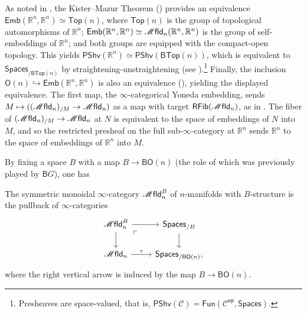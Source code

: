 \documentclass[../text]{subfiles}
\begin{document}
\begin{remark}\label{9EFM44H}
    As noted in \cite{af_fhtop}, the Kister--Mazur Theorem (\cite{kister1964microbundles}) provides an equivalence $\mathsf{Emb}(\mathbb{R}^n,\mathbb{R}^n)\simeq \mathsf{Top}(n)$, where $\mathsf{Top}(n)$ is the group of topological automorphisms of $\mathbb{R}^n$; $\mathsf{Emb}(\mathbb{R}^n,\mathbb{R}^n)\simeq\mfld_n(\mathbb{R}^n,\mathbb{R}^n)$ is the group of self-embeddings of $\mathbb{R}^n$; and both groups are equipped with the compact-open topology. This yields $\mathsf{PShv}(\mathbb{R}^n)\simeq\mathsf{PShv}(\mathsf{BTop}(n))$, which is equivalent to $\mathsf{Spaces}_{/\mathsf{BTop}(n)}$ by straightening-unstraightening (see ).\footnote{Presheaves are space-valued, that is, $\mathsf{PShv}(\mathscr{C})=\mathsf{Fun}(\mathscr{C}^{\mathsf{op}},\mathsf{Spaces})$.} Finally, the inclusion $\mathsf{O}(n)\hookrightarrow\mathsf{Emb}(\mathbb{R}^n,\mathbb{R}^n)$ is also an equivalence (\cite[Proposition 2.2.6]{af_primer}), yielding the displayed equivalence. The first map, the $\infty$-categorical Yoneda embedding, sends $M\mapsto((\mfld_{n})_{/M}\to\mfld_n)$ as a map with target $\mathsf{RFib}(\mfld_n)$, as in \cite{lurie_htt}. The fiber of $(\mfld_{n})_{/M}\to\mfld_n$ at $N$ is equivalent to the space of embeddings of $N$ into $M$, and so the restricted presheaf on the full sub-$\infty$-category at $\mathbb{R}^n$ sends $\mathbb{R}^n$ to the space of embeddings of $\mathbb{R}^n$ into $M$. 
\end{remark}

By fixing a space $B$ with a map $B \rightarrow \mathsf{BO}(n)$ (the role of which was previously played by $\mathsf{B}G$), one has
%
\begin{definition}
    The symmetric monoidal $\infty$-category $\mfld_n^B$ of $n$-manifolds with $B$-structure is the pullback of $\infty$-categories
    \begin{equation}
        \begin{tikzcd}
            \mfld_n^B \arrow[dr, phantom, "\ulcorner", very near start] \arrow[r] \arrow[d] & \mathsf{Spaces}_{/B} \arrow[d] \\
            \mfld_n \arrow[r, "\tau"] & \mathsf{Spaces}_{/\mathsf{BO}(n)},
        \end{tikzcd}
    \end{equation}
    where the right vertical arrow is induced by the map $B \rightarrow \mathsf{BO}(n)$.
\end{definition}
\end{document}
